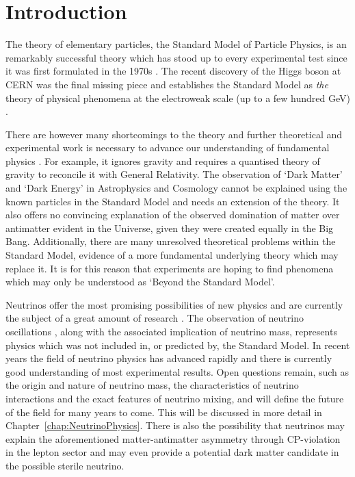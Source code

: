
\graphicspath{{Introduction/Figs/}}

\chapter{Introduction}\label{chap:Introduction}

The theory of elementary particles, the Standard Model of Particle Physics, is an remarkably successful theory which has stood up to every experimental test since it was first formulated in the 1970s \cite{Glashow1961,Weinberg1967}.  The recent discovery of the Higgs boson at CERN \cite{Aad2012,Chatrchyan2012} was the final missing piece and establishes the Standard Model as \textit{the} theory of physical phenomena at the electroweak scale (up to a few hundred GeV) \cite{Shears2012,Bilenky2015}.

There are however many shortcomings to the theory and further theoretical and experimental work is necessary to advance our understanding of fundamental physics \cite{Ellis2012}.  For example, it ignores gravity and requires a quantised theory of gravity to reconcile it with General Relativity.  The observation of `Dark Matter' and `Dark Energy' in Astrophysics and Cosmology cannot be explained using the known particles in the Standard Model and needs an extension of the theory.  It also offers no convincing explanation of the observed domination of matter over antimatter evident in the Universe, given they were created equally in the Big Bang.  Additionally, there are many unresolved theoretical problems within the Standard Model, evidence of a more fundamental underlying theory which may replace it.  It is for this reason that experiments are hoping to find phenomena which may only be understood as `Beyond the Standard Model'.

Neutrinos offer the most promising possibilities of new physics and are currently the subject of a great amount of research \cite{Bilenky2015}.  The observation of neutrino oscillations \cite{SuperKamiokande1998,SNO2002}, along with the associated implication of neutrino mass, represents physics which was not included in, or predicted by, the Standard Model.  In recent years the field of neutrino physics has advanced rapidly and there is currently good understanding of most experimental results.  Open questions remain, such as the origin and nature of neutrino mass, the characteristics of neutrino interactions and the exact features of neutrino mixing, and will define the future of the field for many years to come.  This will be discussed in more detail in Chapter~\ref{chap:NeutrinoPhysics}.  There is also the possibility that neutrinos may explain the aforementioned matter-antimatter asymmetry through CP-violation in the lepton sector and may even provide a potential dark matter candidate in the possible sterile neutrino.

